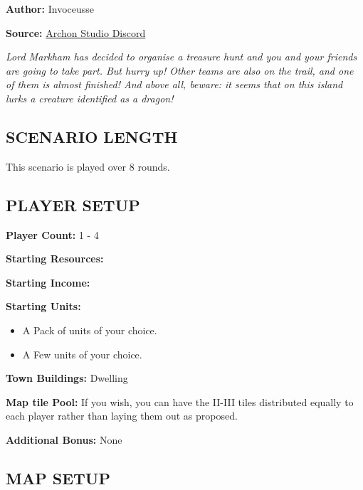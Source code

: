 
\begin{multicols*}{2}

\textbf{Author:} Invoceusse

\textbf{Source:} \href{https://discord.com/channels/740870068178649108/1222679455261261986}{Archon Studio Discord}

\textit{Lord Markham has decided to organise a treasure hunt and you and your friends are going to take part.
  But hurry up! Other teams are also on the trail, and one of them is almost finished!
  And above all, beware: it seems that on this island lurks a creature identified as a dragon!}
\subsection*{\MakeUppercase{Scenario Length}}

This scenario is played over 8 rounds.

\subsection*{\MakeUppercase{Player setup}}

\textbf{Player Count:} 1 - 4

\textbf{Starting Resources:}\par
{}

\textbf{Starting Income:}\par
{}

\textbf{Starting Units:}
\begin{itemize}
  \item A Pack of  units of your choice.
  \item A Few  units of your choice.
\end{itemize}

\textbf{Town Buildings:}  Dwelling

\textbf{Map tile Pool:} If you wish, you can have the II-III tiles distributed equally to each player rather than laying them out as proposed.

\textbf{Additional Bonus:} None

\subsection*{\MakeUppercase{Map Setup}}


\end{multicols*}
